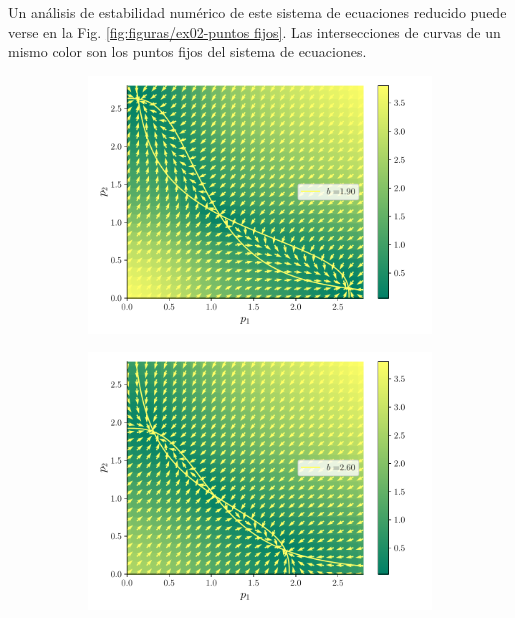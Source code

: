 \documentclass[twocolumn,aps,prl]{revtex4-1}
\begin{document}
Un análisis de estabilidad numérico de este sistema de ecuaciones reducido puede verse en la Fig. \ref{fig:figuras/ex02-puntos fijos}. Las intersecciones de curvas de un mismo color son los puntos fijos del sistema de ecuaciones.

\begin{figure}[ht!]
  \centering
  \begin{subfigure}[b]{0.49\linewidth}
      \centering
      \includegraphics[width = 0.999\textwidth]{figuras/ex02-cosa2-0.pdf}
  \end{subfigure}\quad
  \begin{subfigure}[b]{0.49\linewidth}
      \centering
      \includegraphics[width = 0.999\textwidth]{figuras/ex02-cosa2-1.pdf}

\end{subfigure}
\end{figure}
\end{document}
